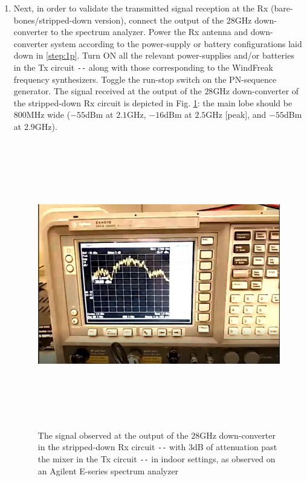 \documentclass[12pt, draftcls, onecolumn]{IEEEtran}
\begin{document}
\begin{enumerate}
    \item Next, in order to validate the transmitted signal reception at the Rx (bare-bones/stripped-down version), connect the output of the $28$GHz down-converter to the spectrum analyzer. Power the Rx antenna and down-converter system according to the power-supply or battery configurations laid down in \ref{step:1p}. Turn ON all the relevant power-supplies and/or batteries in the Tx circuit \texttt{-{}-} along with those corresponding to the WindFreak frequency synthesizers. Toggle the run-stop switch on the PN-sequence generator. The signal received at the output of the $28$GHz down-converter of the stripped-down Rx circuit is depicted in Fig. \ref{fig:10}: the main lobe should be $800$MHz wide ($-55$dBm at $2.1$GHz, $-16$dBm at $2.5$GHz [peak], and $-55$dBm at $2.9$GHz).
    \begin{figure}
        \centering
        \includegraphics[width=15cm, height=12.5cm]{6.png}
        \caption{The signal observed at the output of the $28$GHz down-converter in the stripped-down Rx circuit \texttt{-{}-} with $3$dB of attenuation past the mixer in the Tx circuit \texttt{-{}-} in indoor settings, as observed on an Agilent E-series spectrum analyzer}
        \label{fig:10}
    \end{figure}
\end{enumerate}
\end{document}
